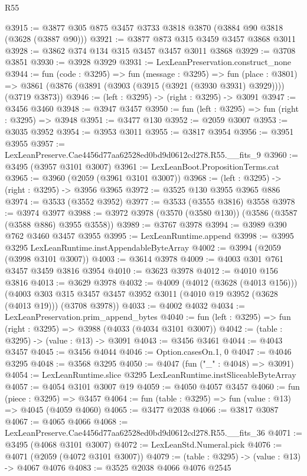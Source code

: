 \begin{lexlean}{R55}
\begin{coremodule}
@3915 := @3877 @305 @875 @3457 @3733 @3818 @3870 (@3884 @90 @3818 (@3628 (@3887 @90)))
@3921 := @3877 @873 @315 @3459 @3457 @3868 @3011
@3928 := @3862 @374 @134 @315 @3457 @3457 @3011 @3868
@3929 := @3708 @3851
@3930 := @3928 @3929
@3931 := LexLeanPreservation.construct_none
@3944 := fun (code : @3295) =>
  fun (message : @3295) =>
  fun (place : @3801) =>
  @3861 (@3876 (@3891 (@3903 (@3915 (@3921 (@3930 @3931) @3929)))) (@3719 @3873))
@3946 := (left : @3295) -> (right : @3295) -> @3091
@3947 := @3456 @3460
@3948 := @3947 @3457
@3950 := fun (left : @3295) => fun (right : @3295) => @3948
@3951 := @3477 @130
@3952 := @2059 @3007
@3953 := @3035 @3952
@3954 := @3953 @3011
@3955 := @3817 @3954
@3956 := @3951 @3955
@3957 := LexLeanPreserve.Cae4456d77aa62528ed0bd9d0612cd278.R55.__fits_9
@3960 := @3495 (@3957 @3101 @3007)
@3961 := LexLeanBoot.PropositionTerms.cat
@3965 := @3960 (@2059 (@3961 @3101 @3007))
@3968 := (left : @3295) -> (right : @3295) -> @3956 @3965
@3972 := @3525 @130 @3955 @3965 @886
@3974 := @3533 (@3552 @3952)
@3977 := @3533 (@3555 @3816) @3558
@3978 := @3974 @3977
@3988 := @3972 @3978 (@3570 (@3580 @130)) (@3586 (@3587 (@3588 @886) @3955 @3558))
@3989 := @3767 @3978
@3994 := @3989 @390 @762 @3460 @3457 @3955
@3995 := LexLeanRuntime.append
@3998 := @3995 @3295 LexLeanRuntime.instAppendableByteArray
@4002 := @3994 (@2059 (@3998 @3101 @3007))
@4003 := @3614 @3978
@4009 := @4003 @301 @761 @3457 @3459 @3816 @3954
@4010 := @3623 @3978
@4012 := @4010 @156 @3816
@4013 := @3629 @3978
@4032 := @4009
    (@4012 (@3628 (@4013 @156)))
    (@4003 @303 @315 @3457 @3457 @3952 @3011 (@4010 @19 @3952 (@3628 (@4013 @19))) (@3708 @3978))
@4033 := @4002 @4032
@4034 := LexLeanPreservation.prim_append_bytes
@4040 := fun (left : @3295) => fun (right : @3295) => @3988 (@4033 (@4034 @3101 @3007))
@4042 := (table : @3295) -> (value : @13) -> @3091
@4043 := @3456 @3461
@4044 := @4043 @3457
@4045 := @3456 @4044
@4046 := Option.casesOn.{1, 0}
@4047 := @4046 @3295
@4048 := @3568 @3295
@4050 := @4047 (fun ("_" : @4048) => @3091)
@4054 := LexLeanRuntime.slice @3295 LexLeanRuntime.instSliceableByteArray
@4057 := @4054 @3101 @3007 @19
@4059 := @4050 @4057 @3457
@4060 := fun (piece : @3295) => @3457
@4064 := fun (table : @3295) => fun (value : @13) => @4045 (@4059 @4060)
@4065 := @3477 @2038
@4066 := @3817 @3087
@4067 := @4065 @4066
@4068 := LexLeanPreserve.Cae4456d77aa62528ed0bd9d0612cd278.R55.__fits_36
@4071 := @3495 (@4068 @3101 @3007)
@4072 := LexLeanStd.Numeral.pick
@4076 := @4071 (@2059 (@4072 @3101 @3007))
@4079 := (table : @3295) -> (value : @13) -> @4067 @4076
@4083 := @3525 @2038 @4066 @4076 @2545

\end{coremodule}
\end{lexlean}
